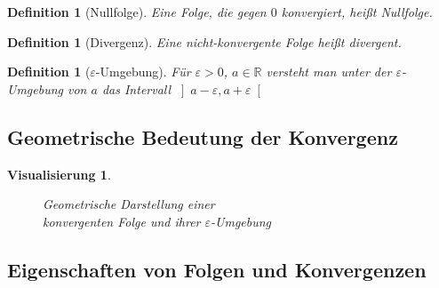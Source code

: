 \documentclass[11pt, twoside, a4paper]{article}
\theoremstyle{plain}
\newtheorem{definition}[blockelement]{Definition}
\newtheorem{visualisierung}[blockelement]{Visualisierung}
\newcommand{\realnumbers}{\mathbb{R}}
\begin{document}
    \begin{definition}[Nullfolge]
        Eine Folge, die gegen $0$ konvergiert, heißt Nullfolge.
    \end{definition}

    \begin{definition}[Divergenz]
        Eine nicht-konvergente Folge heißt divergent.
    \end{definition}

    \begin{definition}[$\varepsilon$-Umgebung]
        Für $\varepsilon > 0$, $a\in\realnumbers$ versteht man unter der $\varepsilon$-Umgebung von $a$ das Intervall $\left]a-\varepsilon, a+\varepsilon\right[$
    \end{definition}

    \subsection{Geometrische Bedeutung der Konvergenz}

    \begin{visualisierung}
        ~
        \begin{figure}[H]
            \centering
            \caption{Geometrische Darstellung einer\\ konvergenten Folge und ihrer $\varepsilon$-Umgebung}
        \end{figure}
    \end{visualisierung}


    \subsection{Eigenschaften von Folgen und Konvergenzen}
\end{document}
